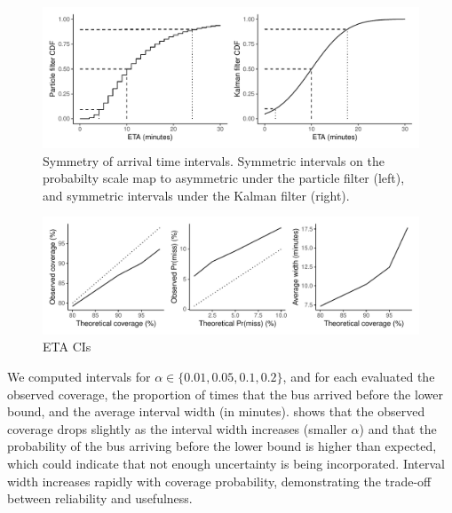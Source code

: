 \begin{knitrout}\small
{}\color{fgcolor}\begin{figure}

{\centering \includegraphics[width=\textwidth]{figure/eta_dist_skew-1} 

}

\caption[Symmetry of arrival time intervals]{Symmetry of arrival time intervals. Symmetric intervals on the probabilty scale map to asymmetric under the particle filter (left), and symmetric intervals under the Kalman filter (right).}\label{fig:eta_dist_skew}
\end{figure}


\end{knitrout}


\begin{knitrout}\small
{}\color{fgcolor}\begin{figure}

{\centering \includegraphics[width=\textwidth]{figure/eta_cis-1} 

}

\caption[ETA CIs]{ETA CIs}\label{fig:eta_cis}
\end{figure}


\end{knitrout}



We computed intervals for $\alpha \in \{0.01, 0.05, 0.1, 0.2\}$, and for each evaluated the observed coverage, the proportion of times that the bus arrived before the lower bound, and the average interval width (in minutes).  shows that the observed coverage drops slightly as the interval width increases (smaller $\alpha$) and that the probability of the bus arriving before the lower bound is higher than expected, which could indicate that not enough uncertainty is being incorporated. Interval width increases rapidly with coverage probability, demonstrating the trade-off between reliability and usefulness.


